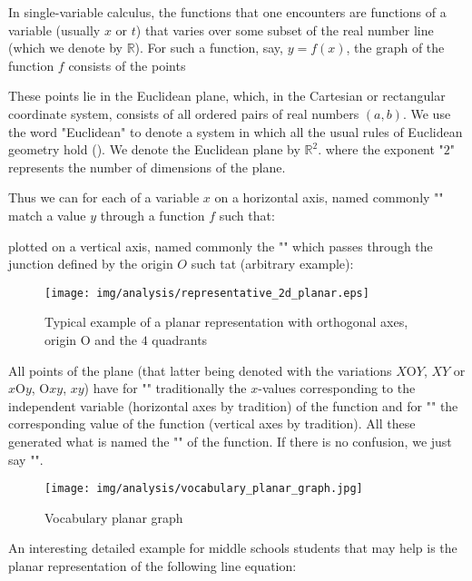 In single-variable calculus, the functions that one encounters are functions of a variable (usually $x$ or $t$) that varies over some subset of the real number line (which we denote by $\mathbb{R}$). For such a function, say, $y = f (x)$, the graph of the function $f$ consists of the points 
	
These points lie in the Euclidean plane, which, in the Cartesian or rectangular
coordinate system, consists of all ordered pairs of real numbers $(a,b)$. We use the word "Euclidean" to denote a system in which all the usual rules of Euclidean geometry hold (). We denote the Euclidean plane by $\mathbb{R}^2$. where the exponent "$2$" represents the number of dimensions of the plane.

Thus we can for each of a variable $x$ on a horizontal axis, named commonly "" match a value $y$ through a function $f$ such that:
	
plotted on a vertical axis, named commonly the "" which passes through the junction defined by the origin $O$ such tat (arbitrary example):
\begin{figure}[H]
	\centering
	\texttt{[image: img/analysis/representative\_2d\_planar.eps]}
	\caption{Typical example of a planar representation with orthogonal axes, origin O and the $4$ quadrants}
\end{figure}
All points of the plane (that latter being denoted with the variations $X\text{O}Y$, $XY$ or $x\text{O}y$, $\text{O}xy$, $xy$) have for "" traditionally the $x$-values corresponding to the independent variable (horizontal axes by tradition) of the function and for "" the corresponding value of the function (vertical axes by tradition). All these generated what is named the "" of the function. If there is no confusion, we just say "".
\begin{figure}[H]
	\centering
	\texttt{[image: img/analysis/vocabulary\_planar\_graph.jpg]}
	\caption{Vocabulary planar graph}
\end{figure}
An interesting detailed example for middle schools students that may help is the planar representation of the following line equation:

